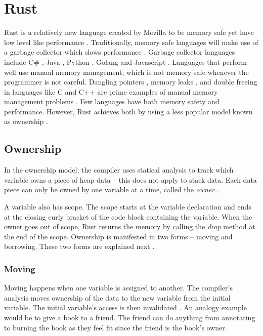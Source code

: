 \section{Rust}
\label{sec:rust}
\newcommand{\errorh}[1]{\textcolor{Red!60!Maroon}{\footnotesize{- #1}}}

Rust is a relatively new language created by Mozilla to be memory safe yet have low level like performance \cite{klabnik_2019_01}.
Traditionally, memory safe languages will make use of a garbage collector which slows performance \cite{hertz_05_01}.
Garbage collector languages include C\# \cite{robinson_04_01}, Java \cite{gosling_96_01}, Python \cite{martelli_06_01}, Golang \cite{tsoukalos_18_01} and Javascript \cite{flanagan_06_01}.
Languages that perform well use manual memory management, which is not memory safe whenever the programmer is not careful.
Dangling pointers \cite{caballero_12_01}, memory leaks \cite{wilson_92_01}, and double freeing \cite{sharp_13_01} in languages like C and C++ are prime examples of manual memory management problems \cite{konrad_18_01}.
Few languages have both memory safety and performance.
However, Rust achieves both by using a less popular model known as ownership \cite{matsakis_14_01}.

\subsection{Ownership}
In the ownership model, the compiler uses statical analysis \cite{rasmussen_2019_01} to track which variable owns a piece of heap data -- this does not apply to stack data.
Each data piece can only be owned by one variable at a time, called the \textit{owner} \cite{klabnik_2019_01}.

A variable also has scope.
The scope starts at the variable declaration and ends at the closing curly bracket of the code block containing the variable.
When the owner goes out of scope, Rust returns the memory by calling the \textit{drop} method at the end of the scope.
Ownership is manifested in two forms -- moving and borrowing.
These two forms are explained next \cite{klabnik_2019_01}.

\subsubsection{Moving}
Moving happens when one variable is assigned to another.
The compiler's analysis moves ownership of the data to the new variable from the initial variable.
The initial variable's access is then invalidated \cite{klabnik_2019_01}.
An analogy example would be to give a book to a friend.
The friend can do anything from annotating to burning the book as they feel fit since the friend is the book's owner.

